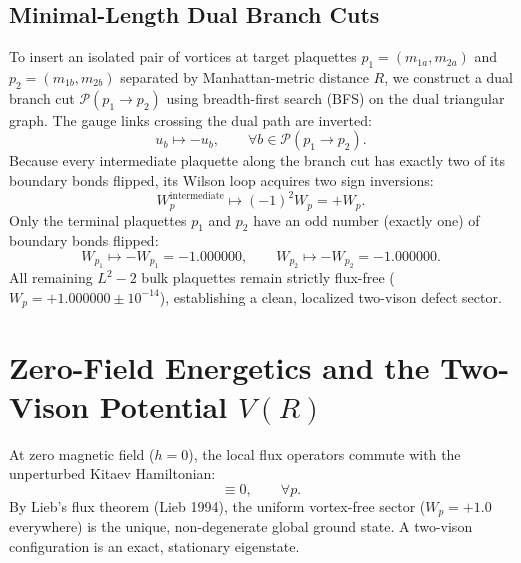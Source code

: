 \subsection{Minimal-Length Dual Branch Cuts}
To insert an isolated pair of vortices at target plaquettes $p_1 = (m_{1a}, m_{2a})$ and $p_2 = (m_{1b}, m_{2b})$ separated by Manhattan-metric distance $R$, we construct a dual branch cut $\mathcal{P}(p_1 \to p_2)$ using breadth-first search (BFS) on the dual triangular graph. The gauge links crossing the dual path are inverted:
\begin{equation}
\label{eq:gauge_link_inversion}
u_b \longmapsto -u_b, \qquad \forall b \in \mathcal{P}(p_1 \to p_2).
\end{equation}
Because every intermediate plaquette along the branch cut has exactly two of its boundary bonds flipped, its Wilson loop acquires two sign inversions:
\begin{equation}
W_p^{\mathrm{intermediate}} \longmapsto (-1)^2 W_p = +W_p.
\end{equation}
Only the terminal plaquettes $p_1$ and $p_2$ have an odd number (exactly one) of boundary bonds flipped:
\begin{equation}
W_{p_1} \longmapsto -W_{p_1} = -1.000000, \qquad W_{p_2} \longmapsto -W_{p_2} = -1.000000.
\end{equation}
All remaining $L^2 - 2$ bulk plaquettes remain strictly flux-free ($W_p = +1.000000 \pm 10^{-14}$), establishing a clean, localized two-vison defect sector.

\section{Zero-Field Energetics and the Two-Vison Potential $V(R)$}
\label{sec:vison_potential_h0}

At zero magnetic field ($h = 0$), the local flux operators commute with the unperturbed Kitaev Hamiltonian:
\begin{equation}
[W_p, H_K] \equiv 0, \qquad \forall p.
\end{equation}
By Lieb's flux theorem (Lieb 1994), the uniform vortex-free sector ($W_p = +1.0$ everywhere) is the unique, non-degenerate global ground state. A two-vison configuration is an exact, stationary eigenstate.



